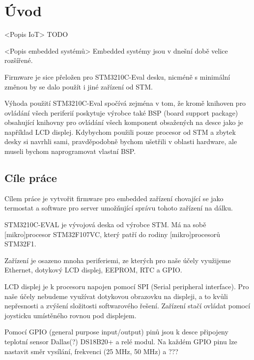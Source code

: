 \chapter*{Úvod}

<Popis IoT>
TODO

<Popis embedded systémů>
Embedded systémy jsou v dnešní době velice rozšířené.

Firmware je sice přeložen pro STM3210C-Eval desku, nicméně s minimální změnou by
se dalo použít i jiné zařízení od STM.

Výhoda použití STM3210C-Eval spočívá zejména v tom, že kromě knihoven pro ovládání
všech periferií poskytuje výrobce také BSP (board support package) obsahující
knihovny pro ovládání všech komponent obsažených na desce jako je například LCD
displej.
Kdybychom použili pouze procesor od STM a zbytek desky si navrhli sami, pravděpodobně
bychom ušetřili v oblasti hardware, ale museli bychom naprogramovat vlastní BSP.

\section{Cíle práce}
Cílem práce je vytvořit firmware pro embedded zařízení chovající se jako termostat
a software pro server umožňující správu tohoto zařízení na dálku.

STM3210C-EVAL je vývojová deska od výrobce STM. Má na sobě [mikro]procesor STM32F107VC,
který patří do rodiny [mikro]procesorů STM32F1.

Zařízení je osazeno mnoha periferiemi, ze kterých pro naše účely využijeme Ethernet,
dotykový LCD displej, EEPROM, RTC a GPIO.

LCD displej je k procesoru napojen pomocí SPI (Serial peripheral interface).
Pro naše účely nebudeme využívat dotykovou obrazovku na displeji, a to kvůli nepřesnosti a
zvýšení složitosti softwarového řešení.
Zařízení stačí ovládat pomocí joysticku umístěného rovnou pod displejem.

Pomocí GPIO (general purpose input/output) pinů jsou k desce připojeny teplotní sensor
Dallas(?) DS18B20+ a relé modul.
Na každém GPIO pinu lze nastavit směr vysílání, frekvenci (25 MHz, 50 MHz) a ???